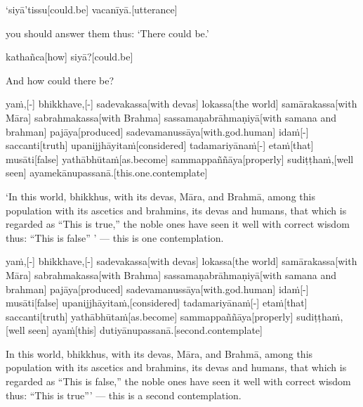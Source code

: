 \begin{samepage}
\begingl[glneveryline={\PaliGlossA,\PaliGlossB}]
‘siyā’tissu[could.be] vacanīyā.[utterance]
\endgl
\nopagebreak
\linespread{0.5}
\begin{spacin}{0.2}
{\PaliGlossFT you should answer them thus: ‘There could be.’}
\end{spacin}
\vskip 12pt
\end{samepage}
\begin{samepage}
\begingl[glneveryline={\PaliGlossA,\PaliGlossB}]
kathañca[how] siyā?[could.be]
\endgl
\nopagebreak
\linespread{0.5}
\begin{spacin}{0.2}
{\PaliGlossFT And how could there be?}
\end{spacin}
\vskip 12pt
\end{samepage}
\begin{samepage}
\begingl[glneveryline={\PaliGlossA,\PaliGlossB}]
yaṁ,[-] bhikkhave,[-] sadevakassa[with devas] lokassa[the world] samārakassa[with Māra] sabrahmakassa[with Brahma] sassamaṇabrāhmaṇiyā[with samana and brahman] pajāya[produced] sadevamanussāya[with.god.human] idaṁ[-] saccanti[truth] upanijjhāyitaṁ[considered] tadamariyānaṁ[-] etaṁ[that] musāti[false] yathābhūtaṁ[as.become] sammappaññāya[properly] sudiṭṭhaṁ,[well seen] ayamekānupassanā.[this.one.contemplate]
\endgl
\nopagebreak
\linespread{0.5}
\begin{spacin}{0.2}
{\PaliGlossFT ‘In this world, bhikkhus, with its devas, Māra, and Brahmā, among this population with its ascetics and brahmins, its devas and humans, that which is regarded as “This is true,” the noble ones have seen it well with correct wisdom thus: “This is false” ’ — this is one contemplation.}
\end{spacin}
\vskip 12pt
\end{samepage}
\begin{samepage}
\begingl[glneveryline={\PaliGlossA,\PaliGlossB}]
yaṁ,[-] bhikkhave,[-] sadevakassa[with devas] lokassa[the world] samārakassa[with Māra] sabrahmakassa[with Brahma] sassamaṇabrāhmaṇiyā[with samana and brahman] pajāya[produced] sadevamanussāya[with.god.human] idaṁ[-] musāti[false] upanijjhāyitaṁ,[considered] tadamariyānaṁ[-] etaṁ[that] saccanti[truth] yathābhūtaṁ[as.become] sammappaññāya[properly] sudiṭṭhaṁ,[well seen] ayaṁ[this] dutiyānupassanā.[second.contemplate]
\endgl
\nopagebreak
\linespread{0.5}
\begin{spacin}{0.2}
{\PaliGlossFT In this world, bhikkhus, with its devas, Māra, and Brahmā, among this population with its ascetics and brahmins, its devas and humans, that which is regarded as “This is false,” the noble ones have seen it well with correct wisdom thus: “This is true”’ — this is a second contemplation.}
\end{spacin}
\vskip 12pt
\end{samepage}
